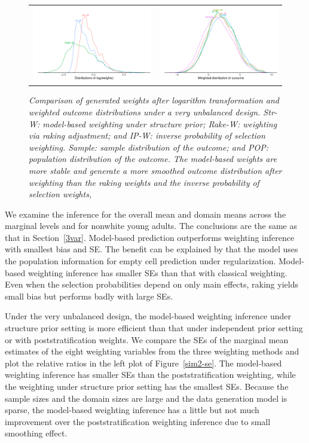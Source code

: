 \documentclass[11pt]{article}
\begin{document}
\begin{figure}
\centering
\begin{tabular}{cc}
\includegraphics[width=.475\textwidth]{plot/weight-var8-case2.pdf}&\includegraphics[width=.475\textwidth]{plot/weighted-case2-density.pdf}
\end{tabular}
\caption{\em Comparison of generated weights after logarithm transformation and weighted outcome distributions under a very unbalanced design. Str-W: model-based weighting under structure prior; Rake-W: weighting via raking adjustment; and IP-W: inverse probability of selection weighting. Sample: sample distribution of the outcome; and POP: population distribution of the outcome. The model-based weights are more stable and generate a more smoothed outcome distribution after weighting than the raking weights and the inverse probability of selection weights, }
\label{sim2-weight}
\end{figure} 


We examine the inference for the overall mean and domain means across the marginal levels and for nonwhite young adults. The conclusions are the same as that in Section~\ref{3var}. Model-based prediction outperforms weighting inference with smallest bias and SE. The benefit can be explained by that the model uses the population information for empty cell prediction under regularization. Model-based weighting inference has smaller SEs than that with classical weighting. Even when the selection probabilities depend on only main effects, raking yields small bias but performs badly with large SEs. 

Under the very unbalanced design, the model-based weighting inference under structure prior setting is more efficient than that under independent prior setting or with poststratification weights. We compare the SEs of the marginal mean estimates of the eight weighting variables from the three weighting methods and plot the relative ratios in the left plot of Figure~\ref{sim2-se}. The model-based weighting inference has smaller SEs than the poststratification weighting, while the weighting under structure prior setting has the smallest SEs. Because the sample sizes and the domain sizes are large and the data generation model is sparse, the model-based weighting inference has a little but not much improvement over the poststratification weighting inference due to small smoothing effect. 
\end{document}
